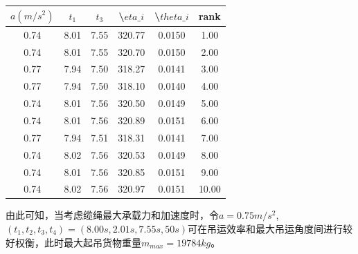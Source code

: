 \documentclass[withoutpreface,bwprint]{cumcmthesis} %
\begin{document}
\begin{table}[!h]
    \centering
\begin{tabular}{|c|c|c|c|c|c|}
    \hline
$a(m/s^2)$ & $t_1$ & $t_3$ & \textbackslash{}$eta\_i$ & \textbackslash{}$theta\_i$ & rank  \\ \hline
0.74       & 8.01  & 7.55  & 320.77                 & 0.0150                   & 1.00  \\ \hline
0.74       & 8.01  & 7.55  & 320.70                 & 0.0150                   & 2.00  \\ \hline
0.77       & 7.94  & 7.50  & 318.27                 & 0.0141                   & 3.00  \\ \hline
0.77       & 7.94  & 7.50  & 318.10                 & 0.0140                   & 4.00  \\ \hline
0.74       & 8.01  & 7.56  & 320.50                 & 0.0149                   & 5.00  \\ \hline
0.74       & 8.01  & 7.56  & 320.89                 & 0.0151                   & 6.00  \\ \hline
0.77       & 7.94  & 7.51  & 318.31                 & 0.0141                   & 7.00  \\ \hline
0.74       & 8.02  & 7.56  & 320.53                 & 0.0149                   & 8.00  \\ \hline
0.74       & 8.01  & 7.56  & 320.85                 & 0.0151                   & 9.00  \\ \hline
0.74       & 8.02  & 7.56  & 320.97                 & 0.0151                   & 10.00 \\ \hline
\end{tabular}
\end{table}
\newpage
由此可知，当考虑缆绳最大承载力和加速度时，令$a=0.75m/s^2$,$(t_1,t_2,t_3,t_4)=(8.00s,2.01s,7.55s,50s)$可在吊运效率和最大吊运角度间进行较好权衡，此时最大起吊货物重量$m_{max}=19784kg$。
\end{document}
